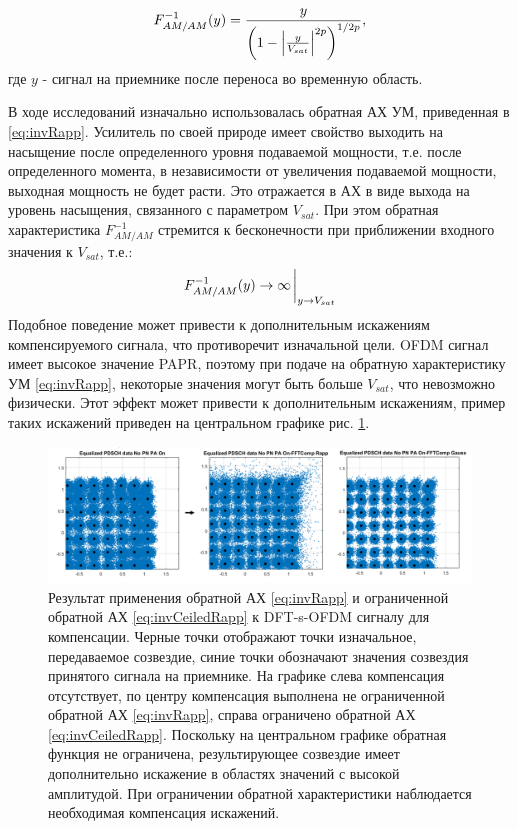 \begin{equation}
    \displaystyle
    F^{-1}_{AM/AM}(y) = 
       \frac{ y}{\left( 1 - \abs{\frac{y}{V_{sat}}}^{2p}\right)^{1/2p}},
    \label{eq:invRapp}
\end{equation}
где $y$ - сигнал на приемнике после переноса во временную область. 


В ходе исследований изначально использовалась обратная АХ УМ, приведенная в
\ref{eq:invRapp}. Усилитель по своей природе имеет свойство выходить на
насыщение после определенного уровня подаваемой мощности, т.е. после
определенного момента, в независимости от увеличения подаваемой мощности,
выходная мощность не будет расти. Это отражается в АХ в виде выхода на
уровень насыщения, связанного с параметром $V_{sat}$. При этом обратная
характеристика $F^{-1}_{AM/AM}$ стремится к бесконечности при приближении
входного значения к $V_{sat}$, т.е.:
\begin{equation}
    F^{-1}_{AM/AM}(y) \rightarrow \infty \eval_{y \rightarrow V_{sat}}
\end{equation}
Подобное поведение может привести к дополнительным искажениям
компенсируемого сигнала, что противоречит изначальной цели. OFDM сигнал
имеет высокое значение PAPR, поэтому при подаче на обратную характеристику
УМ \ref{eq:invRapp}, некоторые значения могут быть больше $V_{sat}$, что
невозможно физически. Этот эффект может привести к дополнительным
искажениям, пример таких искажений приведен на центральном графике рис.
\ref{fig:inf_distortion}.

\begin{figure}[h!]
    \centering
    \includegraphics[width=0.9\linewidth]{figs/ceiled_rapp_result.png}
    \caption{Результат применения обратной АХ \ref{eq:invRapp} и
    ограниченной обратной АХ \ref{eq:invCeiledRapp} к DFT-s-OFDM сигналу
    для компенсации. Черные точки отображают точки изначальное,
    передаваемое созвездие, синие точки обозначают значения созвездия
    принятого сигнала на приемнике. На графике слева компенсация
    отсутствует, по центру компенсация выполнена не ограниченной обратной
    АХ \ref{eq:invRapp}, справа ограничено обратной АХ
    \ref{eq:invCeiledRapp}. Поскольку на центральном графике обратная
    функция не ограничена, результирующее созвездие имеет дополнительно
    искажение в областях значений с высокой амплитудой. При ограничении
    обратной характеристики наблюдается необходимая компенсация искажений.}
    \label{fig:inf_distortion}
\end{figure}

